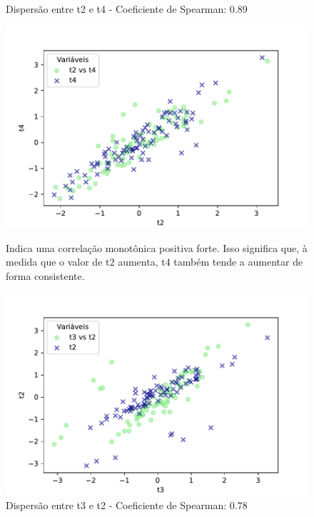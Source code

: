 \begin{figure}[h]
    \captionsetup{font=footnotesize, justification=centering, labelsep=period, position=above}
    \centering
    \begin{minipage}[b]{0.45\linewidth}
        \caption{Dispersão entre t2 e t4 - Coeficiente de Spearman: 0.89}
        \label{fig:t2-t4}
        \centering
        \includegraphics[scale=0.49]{figuras/Spearman/t2-t4.pdf}
        \vspace{0.3cm}
        \caption{Indica uma correlação monotônica positiva forte. Isso significa que, à medida que o valor de t2 aumenta, t4 também tende a aumentar de forma consistente.}
        \begin{minipage}{\linewidth}
            \centering
        \end{minipage}
    \end{minipage}
    \hspace{0.05\linewidth}
    \begin{minipage}[b]{0.45\linewidth}
        \caption{Dispersão entre t3 e t2 - Coeficiente de Spearman: 0.78}
        \label{fig:t3-t2}
        \centering
        \includegraphics[scale=0.35]{figuras/Spearman/t3-t2.pdf}

\end{minipage}
\end{figure}

